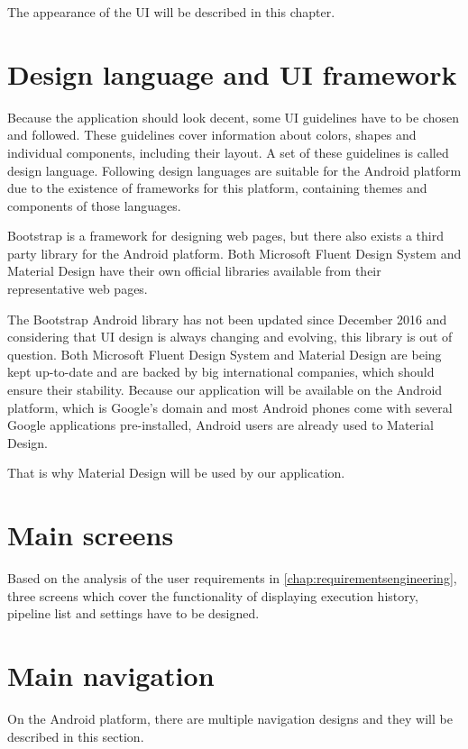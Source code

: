 The appearance of the UI will be described in this chapter.

\section{Design language and UI framework}
Because the application should look decent, some UI guidelines have to be chosen and followed.
These guidelines cover information about colors, shapes and individual components, including their layout.
A set of these guidelines is called design language.
Following design languages are suitable for the Android platform due to the existence of frameworks for this platform, containing themes and components of those languages.

Bootstrap \cite{bootstrap} is a framework for designing web pages, but there also exists a third party library \cite{androidbootstrap} for the Android platform.
Both Microsoft Fluent Design System \cite{fluentui} and Material Design \cite{materialandroid} have their own official libraries available from their representative web pages.

The Bootstrap Android library has not been updated since December 2016 and considering that UI design is always changing and evolving, this library is out of question.
Both Microsoft Fluent Design System and Material Design are being kept up-to-date and are backed by big international companies, which should ensure their stability.
Because our application will be available on the Android platform, which is Google's domain and most Android phones come with several Google applications pre-installed, Android users are already used to Material Design.

That is why Material Design will be used by our application.

\section{Main screens}
Based on the analysis of the user requirements in \autoref{chap:requirementsengineering}, three screens which cover the functionality of displaying execution history, pipeline list and settings have to be designed.

\section{Main navigation}
On the Android platform, there are multiple navigation designs and they will be described in this section.

